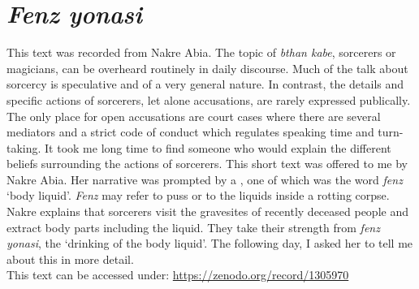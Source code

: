
\appendix
{}

\section*{\emph{Fenz yonasi}}\label{bthan}

This text was recorded from Nakre Abia. The topic of \emph{bthan kabe}, sorcerers or magicians, can be overheard routinely in daily discourse. Much of the talk about sorcercy is speculative and of a very general nature. In contrast, the details and specific actions of sorcerers, let alone accusations, are rarely expressed publically. The only place for open accusations are court cases where there are several mediators and a strict code of conduct which regulates speaking time and turn-taking. It took me long time to find someone who would explain the different beliefs surrounding the actions of sorcerers. This short text was offered to me by Nakre Abia. Her narrative was prompted by a , one of which was the word \emph{fenz} `body liquid'. \emph{Fenz} may refer to puss or to the liquids inside a rotting corpse. Nakre explains that sorcerers visit the gravesites of recently deceased people and extract body parts including the liquid. They take their strength from \emph{fenz yonasi}, the `drinking of the body liquid'. The following day, I asked her to tell me about this in more detail.\\

\noindent
This text can be accessed under: \href{https://zenodo.org/record/1305970}{https://zenodo.org/record/1305970}\\

